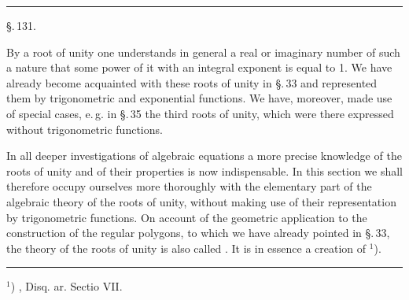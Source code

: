 
\begin{center}

\vspace{1em}

\vspace{0.5em}
\noindent\rule{4cm}{0.4pt}

\vspace{1em}
\S.\,131.

\vspace{0.5em}
\end{center}

\vspace{1em}
By a root of unity one understands in general a real or
imaginary number of such a nature that some power of it with
an integral exponent is equal to 1. We have already become
acquainted with these roots of unity in \S.\,33 and represented
them by trigonometric and exponential functions. We have,
moreover, made use of special cases, e.\,g. in \S.\,35 the third
roots of unity, which were there expressed without trigonometric
functions.

In all deeper investigations of algebraic equations a more
precise knowledge of the roots of unity and of their properties
is now indispensable. In this section we shall therefore occupy
ourselves more thoroughly with the elementary part of the
algebraic theory of the roots of unity, without making use of
their representation by trigonometric functions. On account of
the geometric application to the construction of the regular
polygons, to which we have already pointed in \S.\,33, the theory
of the roots of unity is also called . It is in essence a creation of  $^1$).

\noindent\rule{4cm}{0.4pt}

$^1$) , Disq. ar. Sectio VII.
